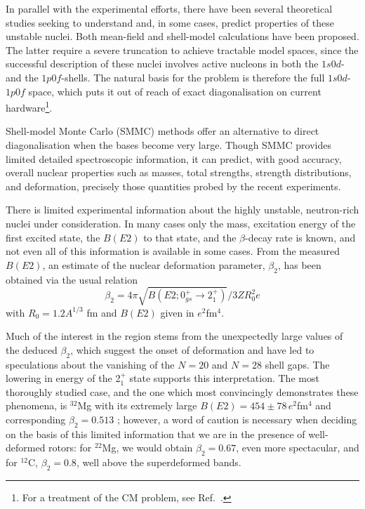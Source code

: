 In parallel with the experimental efforts, there have been several
theoretical studies seeking to understand and, in some cases, predict
properties of these unstable nuclei.  Both mean-field
\cite{Morten:r:werner,Morten:r:campi} and shell-model calculations
\cite{Morten:r:brown1,Morten:r:brown2,Morten:r:wbmb,Morten:r:poves1,%
Morten:r:fukunishi,Morten:r:retamosa,Morten:r:caurier}
have been proposed. The latter require a severe truncation to
achieve tractable model spaces, since the successful description of these
nuclei involves active nucleons in both the $1s0d$- and the $1p0f$-shells.
The natural basis for the problem is therefore the full $1s0d$-$1p0f$
space, which puts it out of reach of exact diagonalisation on current
hardware\footnote{For a treatment of the CM problem, see 
Ref.~.}.

Shell-model Monte Carlo (SMMC) methods \cite{Morten:david97,Morten:r:smmc_ar,Morten:r:lang} 
offer an alternative to direct
diagonalisation when the bases become very large. Though SMMC provides
limited detailed spectroscopic information, it can predict, with good
accuracy, overall nuclear properties such as masses, total strengths,
strength distributions, and deformation, precisely those quantities
probed by the recent experiments. 


There is limited experimental information about the highly unstable,
neutron-rich nuclei under consideration.  In many cases only the mass,
excitation energy of the first excited state, the $B(E2)$ to that state,
and the $\beta$-decay rate is known, and not even all of this
information is available in some cases.  From the
measured $B(E2)$, an estimate of the nuclear deformation parameter,
$\beta_2$, has been obtained via the usual relation
\begin{equation}
\beta_2 = 4 \pi \sqrt{B(E2; 0^+_{gs} \rightarrow 2^+_1)}/3 Z R_0^2 e
\end{equation}
with $R_0 = 1.2 A^{1/3}$ fm and $B(E2)$ given in $e^2$fm$^4$.

Much of the interest in the region stems from the unexpectedly large
values of the deduced $\beta_2$,  which suggest the onset of
deformation and have led to speculations about the vanishing of the $N
= 20$ and $N = 28$ shell gaps.  The lowering in energy of the 2$^+_1$
state supports this interpretation.  The most thoroughly studied case,
and the one which most convincingly demonstrates these phenomena, is
$^{32}$Mg with its extremely large $B(E2) = 454 \pm 78 \, e^2$fm$^4$ and
corresponding $\beta_2 = 0.513$ \cite{Morten:r:motobayashi}; however, a word of
caution is necessary when deciding on the basis of this
limited information that we are in the presence of well-deformed
rotors: for $^{22}$Mg, we would obtain $\beta_2 = 0.67$, even more
spectacular, and for $^{12}$C, $\beta_2 = 0.8$, well above the
superdeformed bands.

